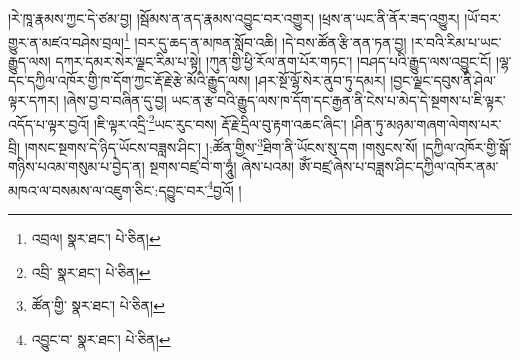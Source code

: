 །རེ་ཁཱ་རྣམས་ཀྱང་དེ་ཙམ་བྱ། །སྦོམས་ན་ནད་རྣམས་འབྱུང་བར་འགྱུར། །ཕྲས་ན་ཡང་ནི་ནོར་ཟད་འགྱུར། །ཡོ་བར་གྱུར་ན་མཛའ་བཤེས་བྲལ།\footnote{འབྲལ།  སྣར་ཐང་།  པེ་ཅིན། } །བར་དུ་ཆད་ན་མཁན་སློབ་འཆི། །དེ་བས་ཚོན་རྩི་ནན་ཏན་བྱ། །ར་བའི་རིམ་པ་ཡང་རྒྱུད་ལས། དཀར་དམར་སེར་ལྗང་རིམ་པ་སྟེ། །ཀུན་གྱི་ཕྱི་རོལ་ནག་པོར་གཏང་། །བཤད་པའི་རྒྱུད་ལས་འབྱུང་ངོ། །ལྷ་དང་དཀྱིལ་འཁོར་གྱི་ཁ་དོག་ཀྱང་རྡོ་རྗེ་རྩེ་མོའི་རྒྱུད་ལས། །ཤར་སྔོ་ལྷོ་སེར་ནུབ་ཏུ་དམར། །བྱང་ལྗང་དབུས་ནི་ཤེལ་ལྟར་དཀར། །ཞེས་བྱ་བ་བཞིན་དུ་བྱ། ཡང་ན་རྩ་བའི་རྒྱུད་ལས་ཁ་དོག་དང་རྒྱན་ནི་ངེས་པ་མེད་དེ་སྔགས་པ་ཇི་ལྟར་འདོད་པ་ལྟར་བྱའོ། །ཇི་ལྟར་འདྲི་\footnote{འབྲི་  སྣར་ཐང་།  པེ་ཅིན། }ཡང་རུང་བས། རྡོ་རྗེ་དྲིལ་བུ་རྟག་འཆང་ཞིང་། །ཤིན་ཏུ་མཉམ་གཞག་ལེགས་པར་བྲི། །གསང་སྔགས་དེ་ཉིད་ཡོངས་བཟླས་ཤིང་། །:ཚོན་གྱིས་\footnote{ཚོན་གྱི་  སྣར་ཐང་།  པེ་ཅིན། }ཐིག་ནི་ཡོངས་སུ་དག །གསུངས་སོ། །དཀྱིལ་འཁོར་གྱི་སྒོ་གཉིས་པའམ་གསུམ་པ་བྱེད་ན། སྔགས་བཛྲ་བེ་ག་ཧཱུཾ། ཞེས་པའམ། ཨོཾ་བཛྲ་ཞེས་པ་བཟླས་ཤིང་དཀྱིལ་འཁོར་ནམ་མཁའ་ལ་བསམས་ལ་འཇུག་ཅིང་:དབྱུང་བར་\footnote{འབྱུང་བ་  སྣར་ཐང་།  པེ་ཅིན། }བྱའོ། །
